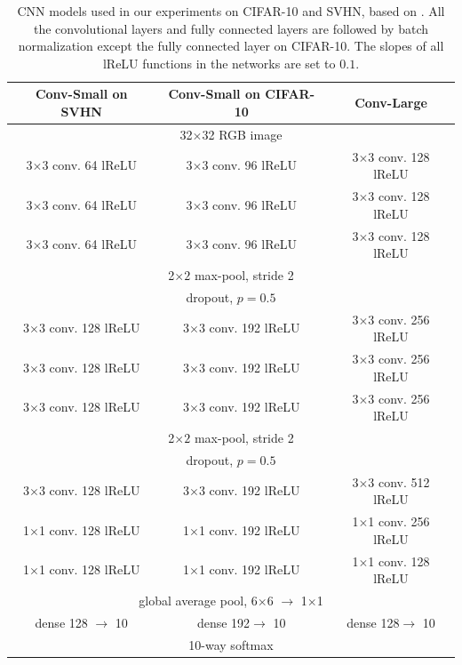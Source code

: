 \documentclass[10pt,journal,compsoc]{IEEEtran}
\begin{document}
\begin{table}
		\centering
		\caption{\label{tab:cnn_models} CNN models used in our experiments on CIFAR-10 and SVHN, based on \cite{springenberg2014striving,salimans2016improved, laine2016temporal}. 
        All the convolutional layers and fully connected layers are followed by batch normalization\cite{ioffe2015batch} except the fully connected layer on CIFAR-10. The slopes of all lReLU\cite{maas2013rectifier} functions in the networks are set to $0.1$.}
		\begin{tabular}{c|c|c}
			\toprule
			Conv-Small on SVHN & Conv-Small on CIFAR-10 & Conv-Large\\
			\midrule
		\multicolumn{3}{c}{32$\times$32 RGB image}  \\
		\midrule	
            3$\times$3 conv. 64 lReLU 		&3$\times$3 conv. 96 lReLU 		& 3$\times$3 conv. 128 lReLU 	\\
            3$\times$3 conv. 64 lReLU 		&3$\times$3 conv. 96 lReLU 		& 3$\times$3 conv. 128 lReLU 	\\
            3$\times$3 conv. 64 lReLU		&3$\times$3 conv. 96 lReLU		& 3$\times$3 conv. 128 lReLU	\\
		\midrule
		\multicolumn{3}{c}{2$\times2$ max-pool, stride 2}  \\
		\multicolumn{3}{c}{dropout, $p=0.5$}  \\
            \midrule   
            3$\times$3 conv. 128 lReLU 		&3$\times$3 conv. 192 lReLU 		& 3$\times$3 conv. 256 lReLU 	\\
            3$\times$3 conv. 128 lReLU 		&3$\times$3 conv. 192 lReLU 		& 3$\times$3 conv. 256 lReLU 	\\
            3$\times$3 conv. 128 lReLU 		&3$\times$3 conv. 192 lReLU 		& 3$\times$3 conv. 256 lReLU 	\\
            \midrule  
		\multicolumn{3}{c}{2$\times2$ max-pool, stride 2}  \\
		\multicolumn{3}{c}{dropout, $p=0.5$}  \\
            \midrule 
            3$\times$3 conv. 128 lReLU 		&3$\times$3 conv. 192 lReLU 		& 3$\times$3 conv. 512 lReLU 	\\
            1$\times$1 conv. 128 lReLU 		&1$\times$1 conv. 192 lReLU 		& 1$\times$1 conv. 256 lReLU 	\\
            1$\times$1 conv. 128 lReLU 		&1$\times$1 conv. 192 lReLU 		& 1$\times$1 conv. 128 lReLU 	\\
                \midrule
		\multicolumn{3}{c}{global average pool, 6$\times$6 $\rightarrow$ 1$\times$1 }  \\
            \midrule   
            dense 128 $\rightarrow$ 10	 		&dense 192$\rightarrow$ 10 	&dense 128$\rightarrow$ 10 \\
            \midrule
		\multicolumn{3}{c}{10-way softmax}  \\
		\bottomrule
		\end{tabular}
\end{table}
\end{document}
